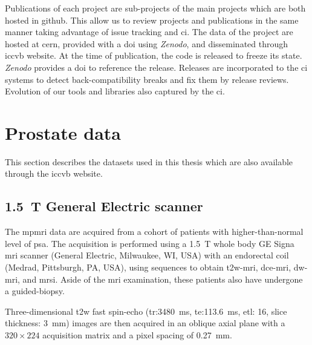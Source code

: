 Publications of each project are sub-projects of the main projects which are both hosted in github.
This allow us to review projects and publications in the same manner taking advantage of issue tracking and \acs{ci}.
The data of the project are hosted at \acs{cern}, provided with a \acs{doi} using \emph{Zenodo}, and disseminated through \acs{iccvb} website.
At the time of publication, the code is released to freeze its state. 
\emph{Zenodo} provides a \acs{doi} to reference the release.
Releases are incorporated to the \acs{ci} systems to detect back-compatibility breaks and fix them by release reviews.
Evolution of our tools and libraries also captured by the \acs{ci}.

\section{Prostate data}
This section describes the datasets used in this thesis which are also available through the \acs{iccvb} website.

\subsection{\SI{1.5}{\tesla} General Electric scanner}

The \ac{mpmri} data are acquired from a cohort of patients with higher-than-normal level of \ac{psa}.
The acquisition is performed using a \SI{1.5}{\tesla} whole body GE Signa \ac{mri} scanner (General Electric, Milwaukee, WI, USA) with an endorectal coil (Medrad, Pittsburgh, PA, USA), using sequences to obtain \ac{t2w}-\ac{mri}, \ac{dce}-\ac{mri}, \ac{dw}-\ac{mri}, and \ac{mrsi}.
Aside of the \ac{mri} examination, these patients also have undergone a guided-biopsy.

Three-dimensional \ac{t2w} fast spin-echo (\ac{tr}:\SI{3480}{\ms}, \ac{te}:\SI{113.6}{\ms}, \ac{etl}: 16, slice thickness: \SI{3}{\mm}) images are then acquired in an oblique axial plane with a  $320 \times 224$ acquisition matrix and a pixel spacing of \SI{0.27}{\milli\metre}.

